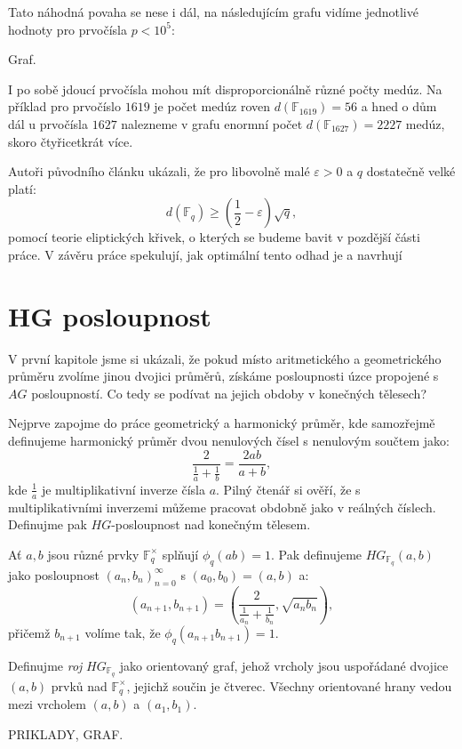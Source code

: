 \documentclass[12pt]{report}
\begin{document}
Tato náhodná povaha se nese i dál, na následujícím grafu vidíme jednotlivé hodnoty pro prvočísla $p < 10^5$:

Graf.

I po sobě jdoucí prvočísla mohou mít disproporcionálně různé počty medúz. Na příklad pro prvočíslo $1619$ je počet medúz roven $d(\mathbb{F}_{1619}) = 56$ a hned o dům dál u prvočísla $1627$ nalezneme v grafu enormní počet $d(\mathbb{F}_{1627}) =2227$ medúz, skoro čtyřicetkrát více.

Autoři původního článku ukázali, že pro libovolně malé $\varepsilon > 0$ a $q$ dostatečně velké platí:
$$d(\mathbb{F}_q) \geqslant \left( \frac{1}{2} - \varepsilon \right) \sqrt{q},$$
pomocí teorie eliptických křivek, o kterých se budeme bavit v pozdější části práce. V závěru práce spekulují, jak optimální tento odhad je a navrhují

\section{HG posloupnost}


V první kapitole jsme si ukázali, že pokud místo aritmetického a geometrického průměru zvolíme jinou dvojici průměrů, získáme posloupnosti úzce propojené s $AG$ posloupností. Co tedy se podívat na jejich obdoby v konečných tělesech? 


Nejprve zapojme do práce geometrický a harmonický průměr, kde samozřejmě definujeme harmonický průměr dvou nenulových čísel s nenulovým součtem jako:
$$\frac{2}{\frac{1}{a}+\frac{1}{b}} = \frac{2ab}{a+b},$$
kde $\frac{1}{a}$ je multiplikativní inverze čísla $a$. Pilný čtenář si ověří, že s multiplikativními inverzemi můžeme pracovat obdobně jako v reálných číslech. Definujme pak $HG$-posloupnost nad konečným tělesem.


\begin{definice}
Ať $a,b$ jsou různé prvky $\mathbb{F}_q ^{\times}$ splňují $\phi_q (ab) = 1$. Pak definujeme $HG_{\mathbb{F}_q}(a,b)$ jako posloupnost $(a_n,b_n)_{n=0}^{\infty}$ s $(a_0,b_0) = (a,b)$ a:
\begin{equation*}
\left(a_{n+1},b_{n+1} \right) = \left(\frac{2}{\frac{1}{a_n} + \frac{1}{b_n}}, \sqrt{a_n b_n} \right),
\end{equation*}
přičemž $b_{n+1}$ volíme tak, že $\phi_q (a_{n+1} b_{n+1}) = 1$.
\end{definice}

\begin{definice}
Definujme \textit{roj} $HG_{\mathbb{F}_q}$ jako orientovaný graf, jehož vrcholy jsou uspořádané dvojice $(a,b)$ prvků nad $\mathbb{F}_q ^{\times}$, jejichž součin je čtverec. Všechny orientované hrany vedou mezi vrcholem $(a,b)$ a $(a_1,b_1)$.
\end{definice}
PRIKLADY, GRAF.
\end{document}
